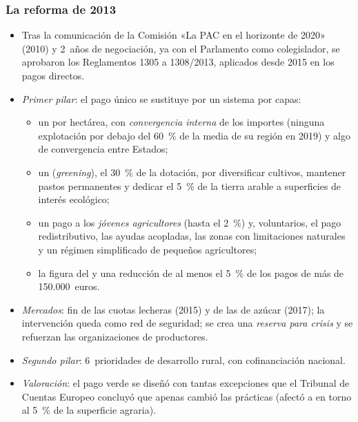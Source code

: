 \documentclass[11pt]{article}
\begin{document}
\subsubsection{La reforma de 2013}\label{sec:reforma-2013}

\begin{itemize}
\item Tras la comunicación de la Comisión «La PAC en el horizonte de 2020» (2010) y 2~años de negociación, ya con el Parlamento como colegislador, se aprobaron los Reglamentos 1305 a 1308/2013, aplicados desde 2015 en los pagos directos\nocite{PE2026FichaInstrumentos}.
\item \emph{Primer pilar}: el pago único se sustituye por un sistema por capas:
  \begin{itemize}
  \item un  por hectárea, con \emph{convergencia interna} de los importes (ninguna explotación por debajo del 60~\% de la media de su región en 2019) y algo de convergencia entre Estados;
  \item un  (\emph{greening}), el 30~\% de la dotación, por diversificar cultivos, mantener pastos permanentes y dedicar el 5~\% de la tierra arable a superficies de interés ecológico;
  \item un pago a los \emph{jóvenes agricultores} (hasta el 2~\%) y, voluntarios, el pago redistributivo, las ayudas acopladas, las zonas con limitaciones naturales y un régimen simplificado de pequeños agricultores;
  \item la figura del  y una reducción de al menos el 5~\% de los pagos de más de 150.000~euros.
  \end{itemize}
\item \emph{Mercados}: fin de las cuotas lecheras (2015) y de las de azúcar (2017); la intervención queda como red de seguridad; se crea una \emph{reserva para crisis} y se refuerzan las organizaciones de productores.
\item \emph{Segundo pilar}: 6~prioridades de desarrollo rural, con cofinanciación nacional.
\item \emph{Valoración}: el pago verde se diseñó con tantas excepciones que el Tribunal de Cuentas Europeo concluyó que apenas cambió las prácticas (afectó a en torno al 5~\% de la superficie agraria)\nocite{TCE2017Greening}.
\end{itemize}

\begin{infografia}[H]
\centering
\caption{Las reformas de la PAC: de los precios a los pagos y a las condiciones}\label{figu:reformas}
\end{infografia}
\end{document}
